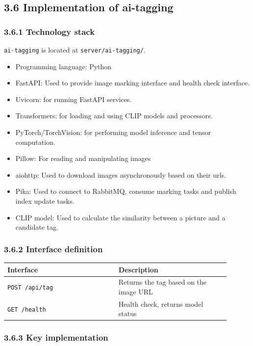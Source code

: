 \documentclass{article}
\begin{document}
\subsection{3.6 Implementation of ai-tagging}

\subsubsection{3.6.1 Technology stack}

\texttt{ai-tagging} is located at \texttt{server/ai-tagging/}.

\begin{itemize}
    \item Programming language: Python
    \item FastAPI: Used to provide image marking interface and health check interface.
    \item Uvicorn: for running FastAPI services.
    \item Transformers: for loading and using CLIP models and processors.
    \item PyTorch/TorchVision: for performing model inference and tensor computation.
    \item Pillow: For reading and manipulating images
    \item aiohttp: Used to download images asynchronously based on their urls.
    \item Pika: Used to connect to RabbitMQ, consume marking tasks and publish index update tasks.
    \item CLIP model: Used to calculate the similarity between a picture and a candidate tag.
\end{itemize}

\subsubsection{3.6.2 Interface definition}

\begin{longtable}{p{0.45\linewidth}p{0.45\linewidth}}
\toprule
\textbf{Interface} & \textbf{Description} \\
\midrule
\texttt{POST /api/tag} & Returns the tag based on the image URL \\
\texttt{GET /health} & Health check, returns model status \\
\bottomrule
\end{longtable}

\subsubsection{3.6.3 Key implementation}
\end{document}
